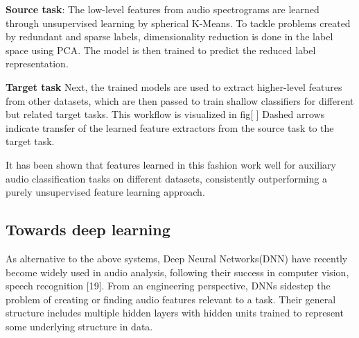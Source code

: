 \noindent \textbf{Source task}: 
The low-level features from audio spectrograms are learned through unsupervised learning by spherical K-Means. To tackle problems created by redundant and sparse labels, dimensionality reduction is done in the label space using PCA. The model is then trained to predict the reduced label representation.
\bigskip

\noindent \textbf{Target task}
Next,  the trained models are used to extract higher-level features from other datasets, which are then passed to train shallow classifiers for different but related target tasks. This workflow is visualized in fig[ ] Dashed arrows indicate transfer of the learned feature extractors from the source task to the target task.
\bigskip

\noindent It has been shown that features learned in this fashion work well for auxiliary audio classification tasks on different datasets, consistently outperforming a purely unsupervised feature learning approach.

\subsection{Towards deep learning}
As alternative to the above systems, Deep Neural Networks(DNN) have recently become widely used in audio analysis, following their success in computer vision, speech recognition [19]. From an engineering perspective, DNNs sidestep the problem of creating or finding audio features relevant to a task. Their general structure includes multiple hidden layers with hidden units trained to represent some underlying structure in data.

